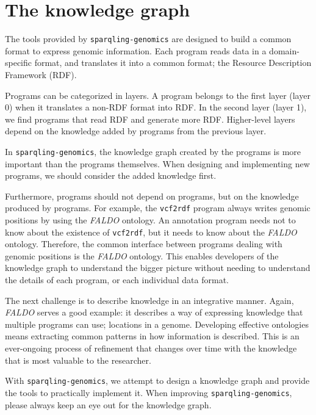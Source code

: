 \chapter{The knowledge graph}

  The tools provided by \texttt{sparqling-genomics} are designed to build a
  common format to express genomic information.  Each program reads data in
  a domain-specific format, and translates it into a common format; the
  Resource Description Framework (RDF).

  Programs can be categorized in layers.  A program belongs to the first
  layer (layer 0) when it translates a non-RDF format into RDF.  In the
  second layer (layer 1), we find programs that read RDF and generate more
  RDF.  Higher-level layers depend on the knowledge added by programs from
  the previous layer.

  In \texttt{sparqling-genomics}, the knowledge graph created by the programs
  is more important than the programs themselves.  When designing and
  implementing new programs, we should consider the added knowledge first.

  Furthermore, programs should not depend on programs, but on the knowledge
  produced by programs.  For example, the \texttt{vcf2rdf} program always
  writes genomic positions by using the \emph{FALDO} ontology.  An annotation
  program needs not to know about the existence of \texttt{vcf2rdf}, but it
  needs to know about the \emph{FALDO} ontology.  Therefore, the common
  interface between programs dealing with genomic positions is the \emph{FALDO}
  ontology.  This enables developers of the knowledge graph to understand
  the bigger picture without needing to understand the details of each
  program, or each individual data format.

  The next challenge is to describe knowledge in an integrative manner.  Again,
  \emph{FALDO} serves a good example: it describes a way of expressing knowledge
  that multiple programs can use; locations in a genome.  Developing effective
  ontologies means extracting common patterns in how information is described.
  This is an ever-ongoing process of refinement that changes over time with the
  knowledge that is most valuable to the researcher.

  With \texttt{sparqling-genomics}, we attempt to design a knowledge graph and
  provide the tools to practically implement it.  When improving
  \texttt{sparqling-genomics}, please always keep an eye out for the knowledge
  graph.
